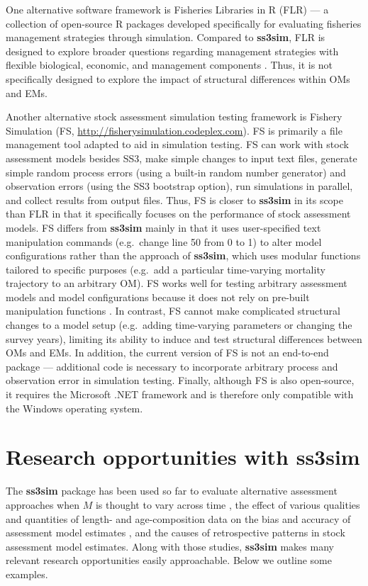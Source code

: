One alternative software framework is Fisheries Libraries in \textsf{R} (FLR)
\cite{kell2007} --- a collection of open-source \textsf{R} packages developed
specifically for evaluating fisheries management strategies through simulation.
Compared to \textbf{ss3sim}, FLR is designed to explore broader questions
regarding management strategies with flexible biological, economic, and
management components \cite{hillary2009}. Thus, it is not specifically designed
to explore the impact of structural differences within OMs and EMs.

Another alternative stock assessment simulation testing framework is Fishery
Simulation (FS, \url{http://fisherysimulation.codeplex.com}). FS is primarily a
file management tool adapted to aid in simulation testing. FS can work with
stock assessment models besides SS3, make simple changes to input text files,
generate simple random process errors (using a built-in random number
generator) and observation errors (using the SS3 bootstrap option), run
simulations in parallel, and collect results from output files. Thus, FS is
closer to \textbf{ss3sim} in its scope than FLR in that it specifically focuses
on the performance of stock assessment models. FS differs from \textbf{ss3sim}
mainly in that it uses user-specified text manipulation commands (e.g.~change
line 50 from 0 to 1) to alter model configurations rather than the approach of
\textbf{ss3sim}, which uses modular functions tailored to specific purposes
(e.g.~add a particular time-varying mortality trajectory to an arbitrary OM).
FS works well for testing arbitrary assessment models and model configurations
because it does not rely on pre-built manipulation functions \cite{lee2012,
  piner2011, lee2011}. In contrast, FS cannot make complicated structural
changes to a model setup (e.g.~adding time-varying parameters or changing the
survey years), limiting its ability to induce and test structural differences
between OMs and EMs. In addition, the current version of FS is not an
end-to-end package --- additional code is necessary to incorporate arbitrary
process and observation error in simulation testing. Finally, although FS is
also open-source, it requires the Microsoft .NET framework and is therefore
only compatible with the Windows operating system.

\section*{Research opportunities with ss3sim}

The \textbf{ss3sim} package has been used so far to evaluate alternative
assessment approaches when $M$ is thought to vary across time
\cite{johnson2014}, the effect of various qualities and quantities of
length- and age-composition data on the bias and accuracy of assessment model
estimates \cite{ono2014}, and the causes of retrospective patterns in stock
assessment model estimates. Along with those studies, \textbf{ss3sim} makes
many relevant research opportunities easily approachable. Below we outline some
examples.

